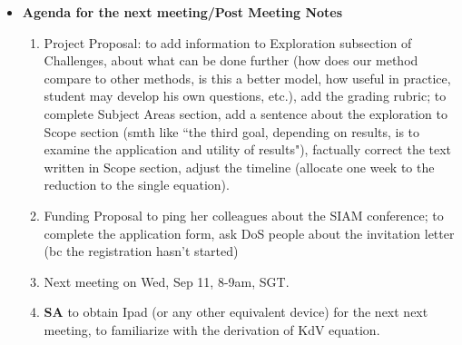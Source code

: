 \documentclass[a4paper,reqno]{article}
\begin{document}
\begin{itemize}
\item \textbf{Agenda for the next meeting/Post Meeting Notes}
 \begin{enumerate}
            	   \item Project Proposal: 
            	    to add information to Exploration subsection of Challenges, about what can be done further (how does our method compare to other methods, is this a better model, how useful in practice, student may develop his own questions, etc.), add the grading rubric; 
            	   \newline
            	   to complete Subject Areas section, add a sentence about the exploration to Scope section (smth like ``the third goal, depending on results, is to examine the application and utility of results"), factually correct the text written in Scope section, adjust the timeline (allocate one week to the reduction to the single equation).
                \item Funding Proposal
            	    to ping her colleagues about the SIAM conference;  
            	   \newline
            	   to complete the application form, ask DoS people about the invitation letter (bc the registration hasn't started)
                \item Next meeting on Wed, Sep 11, 8-9am, SGT.
                \item {\bf SA} to obtain Ipad (or any other equivalent device) for the next next meeting, to familiarize with the derivation of KdV equation.
            \end{enumerate}
               \end{itemize}


\end{document}
